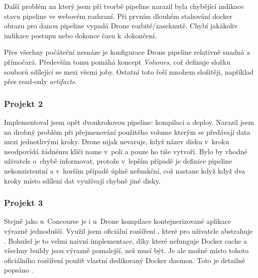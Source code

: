             Další problém na který jsem při tvorbě pipeline narazil byla chybějící indikace stavu pipeline ve webovém rozhraní. Při prvním dlouhém stahování docker obrazu pro danou pipeline vypadá Drone rozbitě/zaseknutě. Chybí jakákoliv indikace postupu nebo dokonce času k~dokončení.

            Přes všechny počáteční nesnáze je konfigurace Drone pipeline relativně snadná a přímočará. Především tomu pomáhá koncept \textit{Volumes}, což definuje složku souborů sdílející se mezi všemi joby. Ostatní \CI toto řeší mnohem složitěji, například přes read-only \textit{artifacts}.

        \subsubsection{Projekt 2}
            Implementoval jsem opět dvoukrokovou pipeline: kompilaci a deploy. Narazil jsem na drobný problém při přejmenování použitého volume kterým se předávají data mezi jednotlivými kroky. Drone nijak nevaruje, když název disku v~kroku neodpovídá žádnému klíči name v~poli  a pouze ho tiše vytvoří. Bylo by vhodné uživatele o~chybě informovat, protože v~lepším případě je definice pipeline nekonzistentní a v~horším případě úplně nefunkční, což nastane když když dva kroky místo sdílení dat využívají chybně jiné disky.

        \subsubsection{Projekt 3}
            Stejně jako u~Concourse je i u~Drone kompilace kontejnerizované aplikace výrazně jednodušší. Využil jsem oficiální rozšíření , které pro uživatele abstrahuje . Bohužel je to velmi naivní implementace, díky které nefunguje Docker cache a všechny buildy jsou výrazně pomalejší, než musí být. Je ale možné místo tohoto oficiálního rozšíření použít vlastní dedikovaný Docker daemon. Toto je detailně popsáno .
